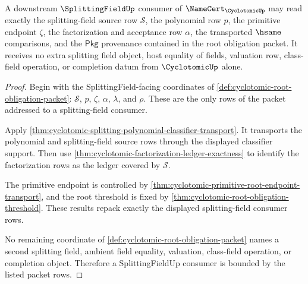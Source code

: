 \begin{theorem}
\label{thm:cyclotomic-splittingfield-consumer-boundary}
A downstream $\SplittingFieldUp$ consumer of $\NameCert_{\CyclotomicUp}$ may
read exactly the splitting-field source row $\mathcal{S}$, the polynomial row
$p$, the primitive endpoint $\zeta$, the factorization and acceptance row
$\alpha$, the transported $\hsame$ comparisons, and the $\mathsf{Pkg}$
provenance contained in the root obligation packet. It receives no extra
splitting field object, host equality of fields, valuation row, class-field
operation, or completion datum from $\CyclotomicUp$ alone.
\end{theorem}
\begin{proof}
Begin with the SplittingField-facing coordinates of
\autoref{def:cyclotomic-root-obligation-packet}: $\mathcal{S}$, $p$, $\zeta$,
$\alpha$, $\lambda$, and $\rho$. These are the only rows of the packet addressed
to a splitting-field consumer.

Apply \autoref{thm:cyclotomic-splitting-polynomial-classifier-transport}. It
transports the polynomial and splitting-field source rows through the displayed
classifier support. Then use
\autoref{thm:cyclotomic-factorization-ledger-exactness} to identify the
factorization rows as the ledger covered by $\mathcal{S}$.

The primitive endpoint is controlled by
\autoref{thm:cyclotomic-primitive-root-endpoint-transport}, and the root
threshold is fixed by \autoref{thm:cyclotomic-root-obligation-threshold}. These
results repack exactly the displayed splitting-field consumer rows.

No remaining coordinate of \autoref{def:cyclotomic-root-obligation-packet}
names a second splitting field, ambient field equality, valuation, class-field
operation, or completion object. Therefore a SplittingFieldUp consumer is
bounded by the listed packet rows.
\end{proof}
